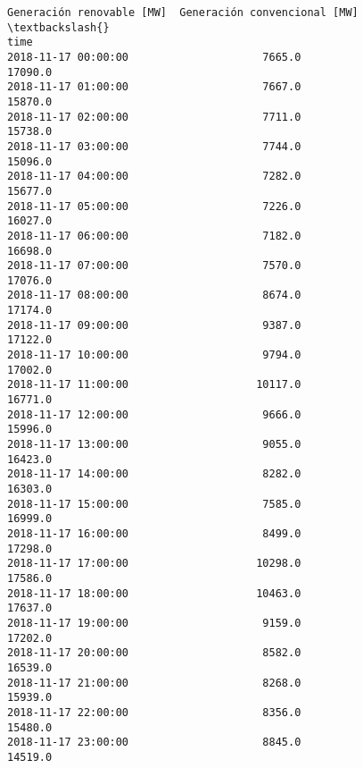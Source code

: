 \documentclass[11pt]{article}
\begin{document}
\begin{tcolorbox}[breakable, size=fbox, boxrule=.5pt, pad at break*=1mm, opacityfill=0]
\begin{Verbatim}[commandchars=\\\{\}]
                     Generación renovable [MW]  Generación convencional [MW]  \textbackslash{}
time
2018-11-17 00:00:00                     7665.0                       17090.0
2018-11-17 01:00:00                     7667.0                       15870.0
2018-11-17 02:00:00                     7711.0                       15738.0
2018-11-17 03:00:00                     7744.0                       15096.0
2018-11-17 04:00:00                     7282.0                       15677.0
2018-11-17 05:00:00                     7226.0                       16027.0
2018-11-17 06:00:00                     7182.0                       16698.0
2018-11-17 07:00:00                     7570.0                       17076.0
2018-11-17 08:00:00                     8674.0                       17174.0
2018-11-17 09:00:00                     9387.0                       17122.0
2018-11-17 10:00:00                     9794.0                       17002.0
2018-11-17 11:00:00                    10117.0                       16771.0
2018-11-17 12:00:00                     9666.0                       15996.0
2018-11-17 13:00:00                     9055.0                       16423.0
2018-11-17 14:00:00                     8282.0                       16303.0
2018-11-17 15:00:00                     7585.0                       16999.0
2018-11-17 16:00:00                     8499.0                       17298.0
2018-11-17 17:00:00                    10298.0                       17586.0
2018-11-17 18:00:00                    10463.0                       17637.0
2018-11-17 19:00:00                     9159.0                       17202.0
2018-11-17 20:00:00                     8582.0                       16539.0
2018-11-17 21:00:00                     8268.0                       15939.0
2018-11-17 22:00:00                     8356.0                       15480.0
2018-11-17 23:00:00                     8845.0                       14519.0


\end{Verbatim}
\end{tcolorbox}
\end{document}
